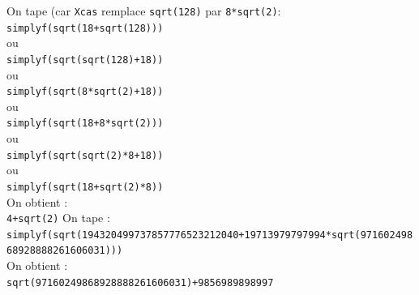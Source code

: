 \documentclass[a4paper,11pt]{book}
\begin{document}
On tape (car {\tt Xcas} remplace {\tt sqrt(128)} par {\tt 8*sqrt(2)}:\\
{\tt simplyf(sqrt(18+sqrt(128)))}\\
ou \\
{\tt simplyf(sqrt(sqrt(128)+18))}\\
ou \\
{\tt simplyf(sqrt(8*sqrt(2)+18))}\\
ou \\
{\tt simplyf(sqrt(18+8*sqrt(2)))}\\
ou \\
{\tt simplyf(sqrt(sqrt(2)*8+18))}\\
ou \\
{\tt simplyf(sqrt(18+sqrt(2)*8))}\\
On obtient :\\
{\tt 4+sqrt(2)}
On tape :\\
{\tt simplyf(sqrt(194320499737857776523212040+19713979797994*sqrt(97160249868928888261606031)))}\\
On obtient :\\
{\tt sqrt(97160249868928888261606031)+9856989898997}
\end{document}
